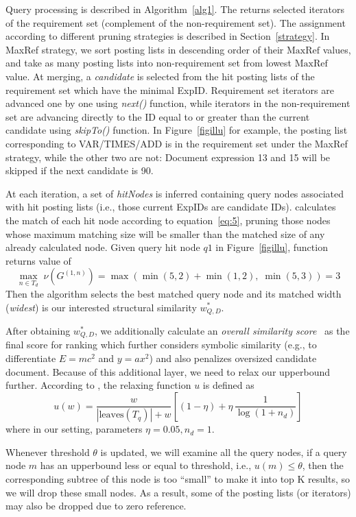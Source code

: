 \documentclass[runningheads]{llncs}
\begin{document}
Query processing is described in Algorithm~\ref{alg1}.
The  returns selected iterators of the requirement set (complement of the non-requirement set).
The assignment according to different pruning strategies is described in Section~\ref{strategy}.
%
In MaxRef strategy, we sort posting lists in descending order of their $\text{MaxRef}$ values, and take as many posting lists into non-requirement set from lowest $\text{MaxRef}$ value.
At merging, a \textit{candidate} is selected from the hit posting lists of the requirement set which have the minimal ExpID.
Requirement set iterators are advanced one by one using \textit{next()} function, while iterators in the non-requirement set are advancing directly to the ID equal to or greater than the current candidate using \textit{skipTo()} function. In Figure~\ref{figillu} for example, the posting list corresponding to VAR/TIMES/ADD is in the requirement set under the MaxRef strategy, while the other two are not: Document expression 13 and 15 will be skipped if the next candidate is 90.

At each iteration, a set of \textit{hitNodes} is inferred containing query nodes associated with hit posting lists (i.e., those current ExpIDs are candidate IDs).
 calculates the match of each hit node according to equation~\ref{eq:5}, pruning those nodes whose maximum matching size will be smaller than the matched size of any already calculated node.
%
Given query hit node $q1$ in Figure~\ref{figillu}, function  returns value of
$$\max_{n\in T_d}\;\nu(G^{(1, n)}) = \max(\min(5, 2) + \min(1, 2),\; \min(5, 3)) = 3$$
Then the algorithm selects the best matched query node and its matched width (\emph{widest}) is our interested structural similarity $w^*_{Q, D}$.

After obtaining $w^*_{Q, D}$, we additionally calculate an \emph{overall similarity score}~\cite{a0_2019} as the final score for ranking which further considers symbolic similarity (e.g., to differentiate $E=mc^2$ and $y=ax^2$) and also penalizes oversized candidate document.
Because of this additional layer, we need to relax our upperbound further.
According to \cite{a0_2019}, the relaxing function $u$ is defined as
\begin{equation}
u(w) = \frac{w}{|\text{leaves}(T_q)| + w} \left[ (1 - \eta) + \eta \, \frac 1 {\log (1 + n_d)} \right]
\end{equation}
where in our setting,  parameters $\eta = 0.05, n_d = 1$.

Whenever threshold $\theta$ is updated, we will examine all the query nodes, if a query node $m$ has an upperbound less or equal to threshold, i.e., $u(m) \le \theta$, then the corresponding subtree of this node is too ``small'' to make it into top K results, so we will drop these small nodes. As a result, some of the posting lists (or iterators) may also be dropped due to zero reference.
\end{document}
